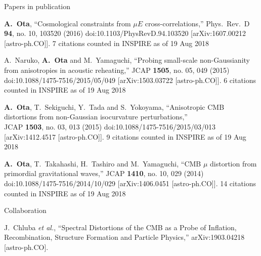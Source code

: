 \documentclass[a4paper]{resume} %
\begin{document}
\begin{rSection}{Papers in publication}
\begin{etaremune}
    \item
  {\bf A.~Ota},
  ``Cosmological constraints from $\mu E$ cross-correlations,''
  Phys.\ Rev.\ D {\bf 94}, no. 10, 103520 (2016)
  doi:10.1103/PhysRevD.94.103520
  [arXiv:1607.00212 [astro-ph.CO]].
  7 citations counted in INSPIRE as of 19 Aug 2018

  \item
    A.~Naruko, {\bf A.~Ota} and M.~Yamaguchi,
  ``Probing small-scale non-Gaussianity from anisotropies in acoustic reheating,''
  JCAP {\bf 1505}, no. 05, 049 (2015)
  doi:10.1088/1475-7516/2015/05/049
  [arXiv:1503.03722 [astro-ph.CO]].
  6 citations counted in INSPIRE as of 19 Aug 2018
  
    \item
  {\bf A.~Ota}, T.~Sekiguchi, Y.~Tada and S.~Yokoyama,
  ``Anisotropic CMB distortions from non-Gaussian isocurvature perturbations,''\\
  JCAP {\bf 1503}, no. 03, 013 (2015)
  doi:10.1088/1475-7516/2015/03/013
  [arXiv:1412.4517 [astro-ph.CO]].
  9 citations counted in INSPIRE as of 19 Aug 2018
  
    \item 
      {\bf A.~Ota}, T.~Takahashi, H.~Tashiro and M.~Yamaguchi,
  ``CMB $\mu$ distortion from primordial gravitational waves,''
  JCAP {\bf 1410}, no. 10, 029 (2014)
  doi:10.1088/1475-7516/2014/10/029
  [arXiv:1406.0451 [astro-ph.CO]].
  14 citations counted in INSPIRE as of 19 Aug 2018
    
\end{etaremune}

\newpage
\end{rSection}


\begin{rSection}{Collaboration}


\begin{etaremune}
\item%
  J.~Chluba {\it et al.},
  ``Spectral Distortions of the CMB as a Probe of Inflation, Recombination, Structure Formation and Particle Physics,''
  arXiv:1903.04218 [astro-ph.CO].
\end{etaremune}






\end{rSection}
\end{document}

